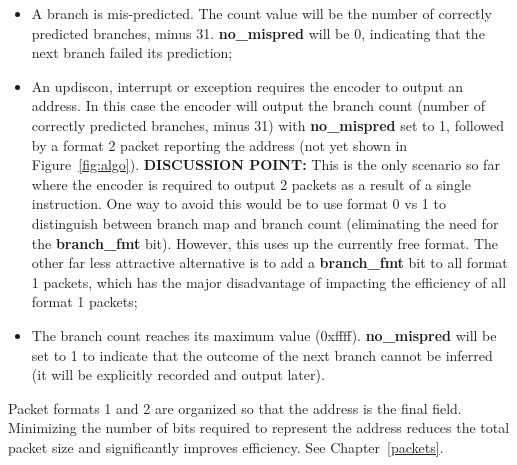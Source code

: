 \begin{itemize}
  \item A branch is mis-predicted.  The count value will be the number of correctly predicted branches, 
    minus 31.  \textbf{no\_mispred} will be 0, indicating that the next branch failed its prediction;
  \item An updiscon, interrupt or exception requires the encoder to output an address.  In this case 
    the encoder will output the branch count (number of correctly predicted branches, minus 31) with 
    \textbf{no\_mispred} set to 1, followed by a format 2 packet reporting the address 
    (not yet shown in Figure~\ref{fig:algo}). 
    \textbf{DISCUSSION POINT:} This is the only scenario so far where the encoder is required to 
    output 2 packets as a result of a single instruction.  One way to avoid this would
    be to use format 0 vs 1 to distinguish between branch map and branch count (eliminating the need for
    the \textbf{branch\_fmt} bit).  However, this uses up the currently free format.  The other far less
    attractive alternative is to add a \textbf{branch\_fmt} bit to all format 1 packets, which has the 
    major disadvantage of impacting the efficiency of all format 1 packets;
  \item The branch count reaches its maximum value (0xffff).  \textbf{no\_mispred} will be set to 1 to
    indicate that the outcome of the next branch cannot be inferred (it will be explicitly recorded and
    output later).   
\end{itemize}

Packet formats 1 and 2 are organized so that the address is the final field.  Minimizing the 
number of bits required to represent the address reduces the total packet size and significantly
improves efficiency.  See Chapter~\ref{packets}.
